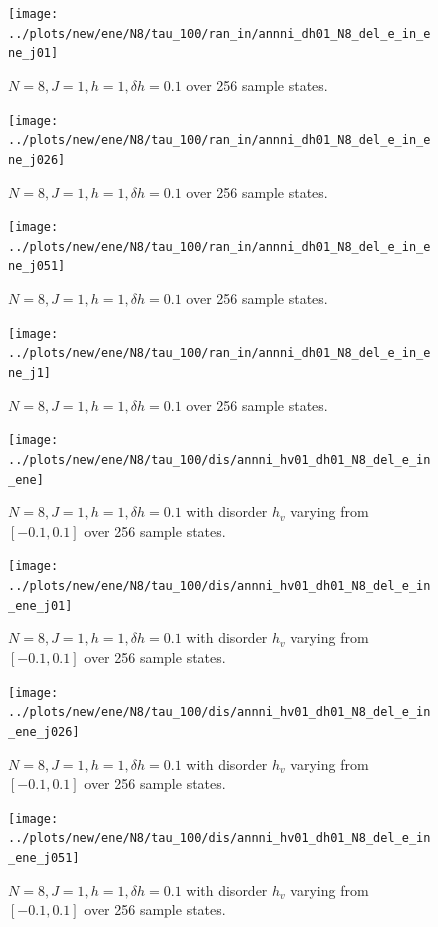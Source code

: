 \documentclass[a4paper]{article}
\begin{document}
\begin{figure}[h!]
  \centering
  \texttt{[image: ../plots/new/ene/N8/tau\_100/ran\_in/annni\_dh01\_N8\_del\_e\_in\_ene\_j01]}
  \caption{$N = 8, J = 1, h = 1, \delta h=0.1$ over 256 sample states.}
  \label{fig:}
\end{figure}

\begin{figure}[h!]
  \centering
  \texttt{[image: ../plots/new/ene/N8/tau\_100/ran\_in/annni\_dh01\_N8\_del\_e\_in\_ene\_j026]}
  \caption{$N = 8, J = 1, h = 1, \delta h=0.1$ over 256 sample states.}
  \label{fig:}
\end{figure}

\begin{figure}[h!]
  \centering
  \texttt{[image: ../plots/new/ene/N8/tau\_100/ran\_in/annni\_dh01\_N8\_del\_e\_in\_ene\_j051]}
  \caption{$N = 8, J = 1, h = 1, \delta h=0.1$ over 256 sample states.}
  \label{fig:}
\end{figure}

\begin{figure}[h!]
  \centering
  \texttt{[image: ../plots/new/ene/N8/tau\_100/ran\_in/annni\_dh01\_N8\_del\_e\_in\_ene\_j1]}
  \caption{$N = 8, J = 1, h = 1, \delta h=0.1$ over 256 sample states.}
  \label{fig:}
\end{figure}

\begin{figure}[h!]
  \centering
  \texttt{[image: ../plots/new/ene/N8/tau\_100/dis/annni\_hv01\_dh01\_N8\_del\_e\_in\_ene]}
  \caption{$N = 8, J = 1, h = 1, \delta h=0.1$ with disorder $h_v$ varying from $[-0.1,0.1]$ over 256 sample states.}
  \label{fig:}
\end{figure}

\begin{figure}[h!]
  \centering
  \texttt{[image: ../plots/new/ene/N8/tau\_100/dis/annni\_hv01\_dh01\_N8\_del\_e\_in\_ene\_j01]}
  \caption{$N = 8, J = 1, h = 1, \delta h=0.1$ with disorder $h_v$ varying from $[-0.1,0.1]$ over 256 sample states.}
  \label{fig:}
\end{figure}

\begin{figure}[h!]
  \centering
  \texttt{[image: ../plots/new/ene/N8/tau\_100/dis/annni\_hv01\_dh01\_N8\_del\_e\_in\_ene\_j026]}
  \caption{$N = 8, J = 1, h = 1, \delta h=0.1$ with disorder $h_v$ varying from $[-0.1,0.1]$ over 256 sample states.}
  \label{fig:}
\end{figure}

\begin{figure}[h!]
  \centering
  \texttt{[image: ../plots/new/ene/N8/tau\_100/dis/annni\_hv01\_dh01\_N8\_del\_e\_in\_ene\_j051]}
  \caption{$N = 8, J = 1, h = 1, \delta h=0.1$ with disorder $h_v$ varying from $[-0.1,0.1]$ over 256 sample states.}
  \label{fig:}
\end{figure}
\end{document}
